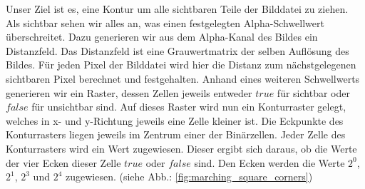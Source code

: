 Unser Ziel ist es, eine Kontur um alle sichtbaren Teile der Bilddatei zu ziehen. Als sichtbar sehen wir alles an, was einen festgelegten Alpha-Schwellwert überschreitet. Dazu generieren wir aus dem Alpha-Kanal des Bildes ein Distanzfeld. Das Distanzfeld ist eine Grauwertmatrix der selben Auflösung des Bildes. Für jeden Pixel der Bilddatei wird hier die Distanz zum nächstgelegenen sichtbaren Pixel berechnet und festgehalten. Anhand eines weiteren Schwellwerts generieren wir ein Raster, dessen Zellen jeweils entweder $true$ für sichtbar oder $false$ für unsichtbar sind.
Auf dieses Raster wird nun ein Konturraster gelegt, welches in x- und y-Richtung jeweils eine Zelle kleiner ist. Die Eckpunkte des Konturrasters liegen jeweils im Zentrum einer der Binärzellen. Jeder Zelle des Konturrasters wird ein Wert zugewiesen. Dieser ergibt sich daraus, ob die Werte der vier Ecken dieser Zelle $true$ oder $false$ sind. Den Ecken werden die Werte $2^0$, $2^1$, $2^3$ und $2^4$ zugewiesen. (siehe Abb.: \ref{fig:marching_square_corners})
\cite{Wisq2022}
